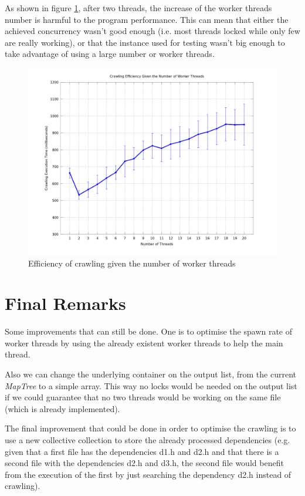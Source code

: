 \documentclass[twocolumn,20pt]{article}
\begin{document}
As shown in figure \ref{fig:eff}, after two threads, the increase of the worker threads number is harmful to the program performance. This can mean that either the achieved concurrency wasn't good enough (i.e. most threads locked while only few are really working), or that the instance used for testing wasn't big enough to take advantage of using a large number or worker threads.

\begin{figure}[h]
\centering
\includegraphics[scale=0.19]{effPerThreadError.png}
\caption{Efficiency of crawling given the number of worker threads}
\label{fig:eff}
\end{figure}

\section{Final Remarks}
Some improvements that can still be done. One is to optimise the spawn rate of worker threads by using the already existent worker threads to help the main thread.

Also we can change the underlying container on the output list, from the current \textit{MapTree} to a simple array. This way no locks would be needed on the output list if we could guarantee that no two threads would be working on the same file (which is already implemented). 

The final improvement that could be done in order to optimise the crawling is to use a new collective collection to store the already processed dependencies (e.g. given that a first file has the dependencies d1.h and d2.h and that there is a second file with the dependencies d2.h and d3.h, the second file would benefit from the execution of the first by just searching the dependency d2.h instead of crawling).
\end{document}
